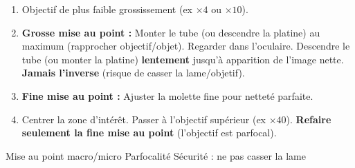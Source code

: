 \documentclass[11pt]{article}
\newcommand{\cle}[1]{{\popxbold\color{popdark}#1}}
\begin{document}
\begin{methode}
\begin{enumerate}
\begin{enumerate}
        \item Objectif de plus faible grossissement (ex $\times 4$ ou $\times 10$).
        \item \textbf{Grosse mise au point :} Monter le tube (ou descendre la platine) au maximum (rapprocher objectif/objet). Regarder dans l'oculaire. Descendre le tube (ou monter la platine) \textbf{lentement} jusqu'à apparition de l'image nette. \textbf{Jamais l'inverse} (risque de casser la lame/objetif).
        \item \textbf{Fine mise au point :} Ajuster la molette fine pour netteté parfaite.
        \item Centrer la zone d'intérêt. Passer à l'objectif supérieur (ex $\times 40$). \textbf{Refaire seulement la fine mise au point} (l'objectif est parfocal).
    \end{enumerate}
\end{enumerate}
\cle{Mise au point macro/micro} \cle{Parfocalité} \cle{Sécurité : ne pas casser la lame}
\end{methode}
\end{document}
